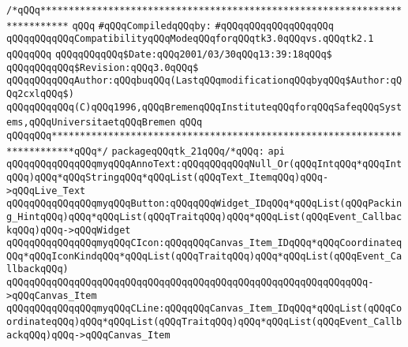 \label{src/lib/tk/src/smltk21.pkg}
\verb|/*qQQq***************************************************************************|\newline
\verb|qQQq|\newline
\verb|#qQQqCompiledqQQqby:|\newline
\verb|#qQQqqQQqqQQqqQQqqQQq|\newline
\newline
\verb|qQQqqQQqqQQqCompatibilityqQQqModeqQQqforqQQqtk3.0qQQqvs.qQQqtk2.1|\newline
\verb|qQQqqQQq|\newline
\verb|qQQqqQQqqQQq$Date:qQQq2001/03/30qQQq13:39:18qQQq$|\newline
\verb|qQQqqQQqqQQq$Revision:qQQq3.0qQQq$|\newline
\verb|qQQqqQQqqQQqAuthor:qQQqbuqQQq(LastqQQqmodificationqQQqbyqQQq$Author:qQQq2cxlqQQq$)|\newline
\newline
\verb|qQQqqQQqqQQq(C)qQQq1996,qQQqBremenqQQqInstituteqQQqforqQQqSafeqQQqSystems,qQQqUniversitaetqQQqBremen|\newline
\verb|qQQq|\newline
\verb|qQQqqQQq**************************************************************************qQQq*/|\newline
\newline
\verb|packageqQQqtk_21qQQq/*qQQq:|\newline
\verb|api|\newline
\verb|qQQqqQQqqQQqqQQqmyqQQqAnnoText:qQQqqQQqqQQqNull_Or(qQQqIntqQQq*qQQqIntqQQq)qQQq*qQQqStringqQQq*qQQqList(qQQqText_ItemqQQq)qQQq->qQQqLive_Text|\newline
\verb|qQQqqQQqqQQqqQQqmyqQQqButton:qQQqqQQqWidget_IDqQQq*qQQqList(qQQqPacking_HintqQQq)qQQq*qQQqList(qQQqTraitqQQq)qQQq*qQQqList(qQQqEvent_CallbackqQQq)qQQq->qQQqWidget|\newline
\verb|qQQqqQQqqQQqqQQqmyqQQqCIcon:qQQqqQQqCanvas_Item_IDqQQq*qQQqCoordinateqQQq*qQQqIconKindqQQq*qQQqList(qQQqTraitqQQq)qQQq*qQQqList(qQQqEvent_CallbackqQQq)|\newline
\verb|qQQqqQQqqQQqqQQqqQQqqQQqqQQqqQQqqQQqqQQqqQQqqQQqqQQqqQQqqQQqqQQq->qQQqCanvas_Item|\newline
\verb|qQQqqQQqqQQqqQQqmyqQQqCLine:qQQqqQQqCanvas_Item_IDqQQq*qQQqList(qQQqCoordinateqQQq)qQQq*qQQqList(qQQqTraitqQQq)qQQq*qQQqList(qQQqEvent_CallbackqQQq)qQQq->qQQqCanvas_Item|\newline

